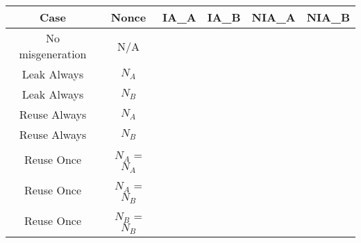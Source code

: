 \documentclass[crop]{standalone}
\newcommand{\noattack}{\color{ForestGreen}\usym{2713}\color{black}}
\newcommand{\attack}{\color{red}\usym{2717}\color{black}}
\begin{document}
\parbox{15cm}{
\begin{tabular}{|c|c|c|c|c|c|}
\hline
Case & Nonce & IA\_A & IA\_B & NIA\_A & NIA\_B \\ \hline
No misgeneration & N/A & \noattack & \noattack & \noattack & \noattack\\ \hline
Leak Always & $N_A$ & \attack & \noattack & \attack & \noattack\\ \hline
Leak Always & $N_B$ & \noattack & \attack & \noattack & \attack\\ \hline
Reuse Always & $N_A$ & \attack & \noattack & \attack & \noattack\\ \hline
Reuse Always & $N_B$ & \noattack & \attack & \noattack & \attack\\ \hline
Reuse Once & $N_A$ = $N_A$ & \attack & \noattack & \attack & \noattack\\ \hline
Reuse Once & $N_A$ = $N_B$ & \attack & \attack & \attack & \attack\\ \hline
Reuse Once & $N_B$ = $N_B$ & \noattack & \attack & \noattack & \attack\\ \hline
\end{tabular}}
\end{document}
